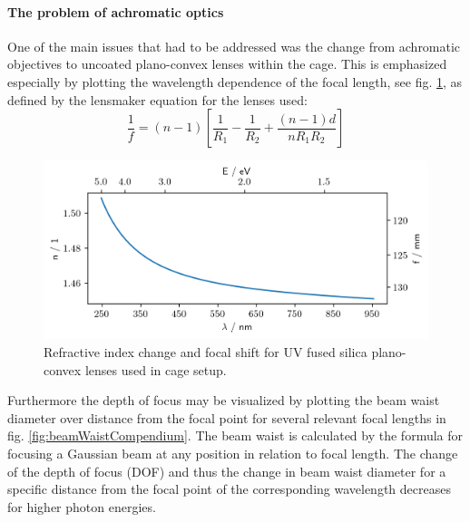 \documentclass[twoside,openright]{scrreprt}
\begin{document}
\paragraph{The problem of achromatic optics}
One of the main issues that had to be addressed was the change from achromatic objectives to uncoated plano-convex lenses within the cage.
This is emphasized especially by plotting the wavelength dependence of the focal length, see fig. \ref{fig:ChromFocalShift}, as defined by the lensmaker equation for the lenses used:
\begin{equation}
\frac{1}{f} = (n-1) \left[\frac{1}{R_1} - \frac{1}{R_2} + \frac{(n-1)d}{n R_1 R_2}\right]
\end{equation}
\begin{figure}[h]
\centering
\includegraphics[scale = 1]{images/ChromaticFocalShiftandDispersionUVFS.png} 
\caption{Refractive index change and focal shift for UV fused silica plano-convex lenses used in cage setup.\cite{Malitson:65}\label{fig:ChromFocalShift}}
\end{figure}

Furthermore the depth of focus may be visualized by plotting the beam waist diameter over distance from the focal point for several relevant focal lengths in fig. \ref{fig:beamWaistCompendium}. The beam waist is calculated by the formula for focusing a Gaussian beam at any position in relation to focal length.\cite{Li1994} The change of the depth of focus (DOF) and thus the change in beam waist diameter for a specific distance from the focal point of the corresponding wavelength decreases for higher photon energies.
\end{document}
